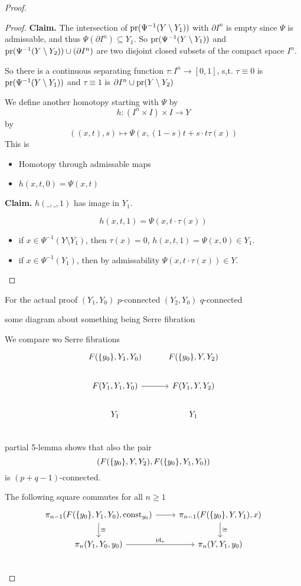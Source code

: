 \documentclass[language=english]{TemplateLecture}
\begin{document}
\begin{proof}
\begin{proof}
    \textbf{Claim.} The intersection of \(\operatorname{pr}(\Psi^{-1}(Y\setminus Y_1))\) with \(\partial I^n\) is empty since \(\Psi\) is admissable, and thus \(\Psi(\partial I^n)\subseteq Y_1\). So \(\operatorname{pr}(\Psi^{-1}(Y\setminus Y_1))\) and \(\operatorname{pr}(\Psi^{-1}(Y\setminus Y_2))\cup (\partial I^n)\) are two disjoint closed subsets of the compact space \(I^n\).

    So there is a continuous separating function \(\tau\colon I^n \to [0,1]\), s,t. \(\tau\equiv 0\) is \(\operatorname{pr}(\Psi^{-1}(Y\setminus Y_1))\) and \(\tau\equiv 1\) is \(\partial I^n \cup \operatorname{pr}(Y\setminus Y_2)\)
    
    We define another homotopy starting with \(\Psi\) by
    \[h\colon (I^n\times I)\times I \to Y\]
    by
    \[((x,t),s) \mapsto \Psi(x,(1-s)t + s\cdot t \tau(x))\]
    This is
    \begin{itemize}
        \item Homotopy through admissable maps
        \item \(h(x,t,0) = \Psi(x,t)\)
    \end{itemize}
    \textbf{Claim.} \(h(\_,\_, 1)\) has image in \(Y_1\).

    \[h(x,t,1) = \Psi(x, t\cdot\tau(x))\]
    \begin{itemize}
        \item if \(x \in \Psi^{-1}(Y\setminus Y_1)\), then \(\tau(x) = 0\), \(h(x,t,1) = \Psi(x,0) \in Y_1\).
        \item if \(x \in \Psi^{-1}(Y_1)\), then by admissability \(\Psi(x,t\cdot\tau(x))\in Y\).
    \end{itemize}
\end{proof}

For the actual proof \((Y_1, Y_0)\) \(p\)-connected \((Y_2, Y_0)\) \(q\)-connected

some diagram about something being Serre fibration

We compare wo Serre fibrations
\[\begin{tikzcd}
    F(\set{y_0}, Y_1, Y_0) & F(\set{y_0}, Y, Y_2) \\
    F(Y_1, Y_1, Y_0) \ar[r] & F(Y_1, Y, Y_2) \\
    Y_1  & Y_1 \\
\end{tikzcd}\]
partial 5-lemma shows that also the pair
\[(F(\{y_0\}, Y, Y_2), F(\{y_0\}, Y_1, Y_0))\]
is \((p+q-1)\)-connected.

The following square commutes for all \(n \geq 1\)
\[\begin{tikzcd}
    \pi_{n-1}(F(\set{y_0}, Y_1, Y_0), \const_{y_0})\ar[d, "\cong"] \ar[r] & \pi_{n-1}(F(\set{y_0}, Y, Y_1), x) \ar[d, "\cong"]\\
    \pi_n(Y_1, Y_0, y_0) \ar[r, "\id_*"] & \pi_n(Y, Y_1, y_0) \\
\end{tikzcd}\]
\end{proof}
\end{document}
